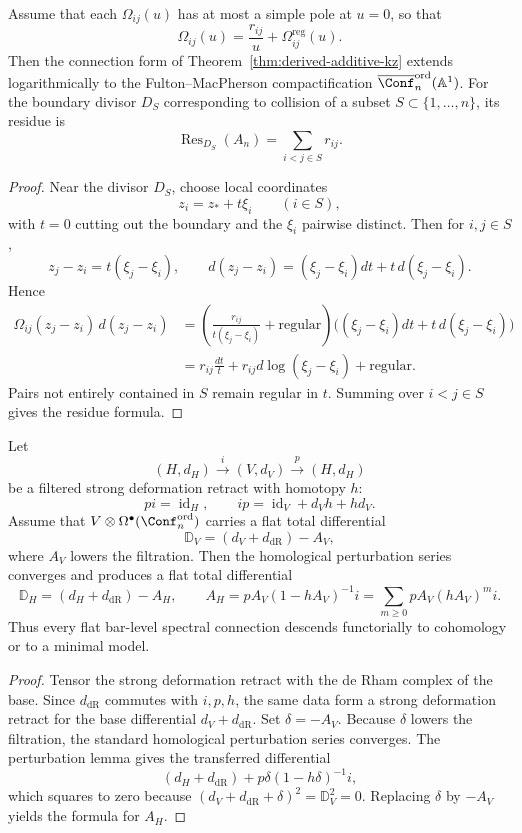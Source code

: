 \begin{theorem}
\label{thm:boundary-residue}
Assume that each $\Omega_{ij}(u)$ has at most a simple pole at $u=0$,
so that
\[
\Omega_{ij}(u)=\frac{r_{ij}}{u}+\Omega_{ij}^{\mathrm{reg}}(u).
\]
Then the connection form of Theorem~\ref{thm:derived-additive-kz}
extends logarithmically to the Fulton--MacPherson compactification
$\overline{\Conf}_n^{\mathrm{ord}}(\mathbb A^1)$.
For the boundary divisor $D_S$ corresponding to collision of a subset
$S\subset\{1,\dots,n\}$, its residue is
\[
\operatorname{Res}_{D_S}(A_n)=\sum_{i<j\in S} r_{ij}.
\]
\end{theorem}

\begin{proof}
Near the divisor $D_S$, choose local coordinates
\[
z_i=z_*+t\xi_i\qquad (i\in S),
\]
with $t=0$ cutting out the boundary and the $\xi_i$ pairwise distinct.
Then for $i,j\in S$,
\[
z_j-z_i=t(\xi_j-\xi_i),
\qquad
 d(z_j-z_i)=(\xi_j-\xi_i)dt+t\,d(\xi_j-\xi_i).
\]
Hence
\begin{align*}
\Omega_{ij}(z_j-z_i)\,d(z_j-z_i)
&=
\left(\frac{r_{ij}}{t(\xi_j-\xi_i)}+\text{regular}\right)
\big((\xi_j-\xi_i)dt+t\,d(\xi_j-\xi_i)\big)\\
&=r_{ij}\frac{dt}{t}+r_{ij}d\log(\xi_j-\xi_i)+\text{regular}.
\end{align*}
Pairs not entirely contained in $S$ remain regular in $t$.
Summing over $i<j\in S$ gives the residue formula.
\end{proof}

\begin{theorem}
\label{thm:transfer-flat-spectral}
Let
\[
(H,d_H)
\xrightarrow{i}
(V,d_V)
\xrightarrow{p}
(H,d_H)
\]
be a filtered strong deformation retract with homotopy $h$:
\[
pi=\operatorname{id}_H,
\qquad
ip=\operatorname{id}_V+d_Vh+hd_V.
\]
Assume that $V\otimes \Omega^\bullet(\Conf_n^{\mathrm{ord}})$ carries a
flat total differential
\[
\mathbb D_V=(d_V+d_{\mathrm{dR}})-A_V,
\]
where $A_V$ lowers the filtration. Then the homological perturbation
series converges and produces a flat total differential
\[
\mathbb D_H=(d_H+d_{\mathrm{dR}})-A_H,
\qquad
A_H=pA_V(1-hA_V)^{-1}i=
\sum_{m\ge 0} pA_V(hA_V)^mi.
\]
Thus every flat bar-level spectral connection descends functorially to
cohomology or to a minimal model.
\end{theorem}

\begin{proof}
Tensor the strong deformation retract with the de Rham complex of the
base. Since $d_{\mathrm{dR}}$ commutes with $i,p,h$, the same data form a
strong deformation retract for the base differential
$d_V+d_{\mathrm{dR}}$. Set $\delta=-A_V$. Because $\delta$ lowers the
filtration, the standard homological perturbation series converges.
The perturbation lemma gives the transferred differential
\[
(d_H+d_{\mathrm{dR}})+p\delta(1-h\delta)^{-1}i,
\]
which squares to zero because
$(d_V+d_{\mathrm{dR}}+\delta)^2=\mathbb D_V^2=0$.
Replacing $\delta$ by $-A_V$ yields the formula for $A_H$.
\end{proof}

